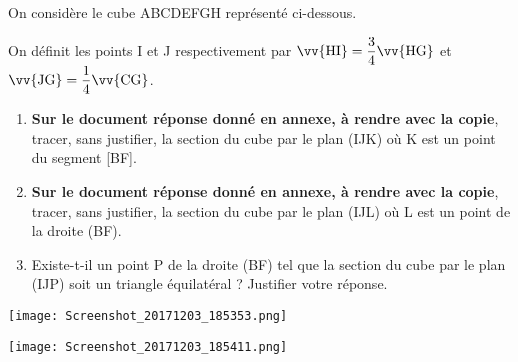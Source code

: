 \documentclass[a4paper,12pt,frenchb]{article}
\begin{document}
\begin{question}[subtitle={espace}]

On considère le cube ABCDEFGH représenté ci-dessous.

On définit les points I et J respectivement par $\vv{\text{HI}} = \dfrac{3}{4} \vv{\text{HG}}$ et $\vv{\text{JG}} = \dfrac{1}{4} \vv{\text{CG}}$.


\begin{enumerate}
\item \textbf{Sur le document réponse donné en annexe, à rendre avec la copie}, tracer, sans justifier, la section du cube par le plan (IJK) où K est un point du segment [BF].
\item \textbf{Sur le document réponse donné en annexe, à rendre avec la copie}, tracer, sans justifier, la section du cube par le plan (IJL) où L est un point de la droite (BF).
\item Existe-t-il un point P de la droite (BF) tel que la section du cube par le plan (IJP)
soit un triangle équilatéral ? Justifier votre réponse.
\end{enumerate}

\pagebreak

\begin{center}
  \vspace{3cm}
  \texttt{[image: Screenshot\_20171203\_185353.png]}

  \vspace{4cm}

  \texttt{[image: Screenshot\_20171203\_185411.png]}

  \vspace{3cm}
\end{center}

\end{question}
\end{document}
